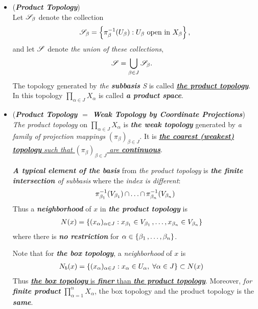 \documentclass[11pt]{article}
\begin{document}
\begin{itemize}
\item \begin{definition} (\emph{\textbf{Product Topology}})\\
Let ${\mathscr S}_\beta$ denote the collection
\begin{align*}
{\mathscr S}_\beta = \left\{ \pi_\beta^{-1}(U_\beta): U_{\beta}\text{ open in }X_\beta\right\},
\end{align*}
and let ${\mathscr S}$ denote \emph{the union of these collections},
\begin{align*}
{\mathscr S} &= \bigcup_{\beta \in J} {\mathscr S}_\beta.
\end{align*}
The topology generated by \emph{the \textbf{subbasis} S} is called \underline{\emph{\textbf{the product topology}}}. In this 
topology $\prod_{\alpha \in J} X_{\alpha}$ is called \emph{\textbf{a product space}}.
\end{definition}

\item \begin{remark} (\emph{\textbf{Product Topology $=$ Weak Topology by Coordinate Projections}})\\
\emph{The product topology} on $\prod_{\alpha \in J} X_{\alpha}$ is \emph{\textbf{the weak topology}} generated by \emph{a family of projection mappings} $(\pi_{\beta})_{\beta \in J}$. It is \underline{\emph{\textbf{the coarest (weakest) topology} such that $(\pi_{\beta})_{\beta \in J}$ are \textbf{continuous}}}.

\emph{\textbf{A typical element of the basis}} from \emph{the product topology} is \emph{\textbf{the finite intersection} of subbasis} where the \emph{index is different}:
\begin{align*}
\pi_{\beta_1}^{-1}(V_{\beta_1}) \,{\cap}\ldots{\cap}\, \pi_{\beta_n}^{-1}(V_{\beta_n})
\end{align*} Thus a \emph{\textbf{neighborhood}} of $x$ in \emph{\textbf{the product topology}} is \
\begin{align*}
N(x) &= \left\{(x_{\alpha})_{\alpha \in J}:  x_{\beta_1} \in V_{\beta_1} \,{,}\ldots{,}\, x_{\beta_n} \in V_{\beta_n}\right\}
\end{align*} where there is \emph{\textbf{no restriction}} for $\alpha \in \left\{\beta_1 \,{,}\ldots{,}\, \beta_n\right\}$.

Note that for \emph{\textbf{the box topology}}, a \emph{neighborhood} of $x$ is
\begin{align*}
N_b(x) &= \left\{(x_{\alpha})_{\alpha \in J}:  x_{\alpha} \in U_{\alpha}, \; \forall \alpha \in J\right\} \subset N(x)
\end{align*} Thus \underline{\emph{\textbf{the box topology}} is \emph{\textbf{finer}} than \emph{\textbf{the product topology}}}. Moreover, \emph{for \textbf{finite product}}  $\prod_{\alpha =1}^{n} X_{\alpha}$, the box topology and the product topology is the \emph{\textbf{same}}.
\end{remark}



\end{itemize}
\end{document}
